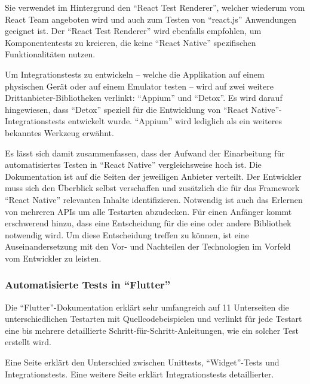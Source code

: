 Sie verwendet im Hintergrund den \enquote{React Test Renderer}, welcher wiederum vom React Team angeboten wird und auch zum Testen von \enquote{react.js} Anwendungen geeignet ist.
Der \enquote{React Test Renderer} wird ebenfalls empfohlen, um Komponententests zu kreieren, die keine \enquote{React Native} spezifischen Funktionalitäten nutzen.

Um Integrationstests zu entwickeln -- welche die Applikation auf einem physischen Gerät oder auf einem Emulator testen -- wird auf zwei weitere Drittanbieter-Bibliotheken verlinkt:
\enquote{Appium} und \enquote{Detox}.
Es wird darauf hingewiesen, dass \enquote{Detox} speziell für die Entwicklung von \enquote{React Native}-Integrationstests entwickelt wurde.
\enquote{Appium} wird lediglich als ein weiteres bekanntes Werkzeug erwähnt.

Es lässt sich damit zusammenfassen, dass der Aufwand der Einarbeitung für automatisiertes Testen in \enquote{React Native} vergleichsweise hoch ist.
Die Dokumentation ist auf die Seiten der jeweiligen Anbieter verteilt.
Der Entwickler muss sich den Überblick selbst verschaffen und zusätzlich die für das Framework \enquote{React Native} relevanten Inhalte identifizieren.
Notwendig ist auch das Erlernen von mehreren APIs um alle Testarten abzudecken.
Für einen Anfänger kommt erschwerend hinzu, dass eine Entscheidung für die eine oder andere Bibliothek notwendig wird.
Um diese Entscheidung treffen zu können, ist eine Auseinandersetzung mit den Vor- und Nachteilen der Technologien im Vorfeld vom Entwickler zu leisten.

\subsubsection{Automatisierte Tests in \enquote{Flutter}} Die \enquote{Flutter}-Dokumentation erklärt sehr umfangreich auf 11 Unterseiten die unterschiedlichen Testarten mit Quellcodebeispielen und verlinkt für jede Testart eine bis mehrere detaillierte Schritt-für-Schritt-Anleitungen,
wie ein solcher Test erstellt wird.

Eine Seite erklärt den Unterschied zwischen Unittests, \enquote{Widget}-Tests und Integrationstests.
Eine weitere Seite erklärt Integrationstests detaillierter.

